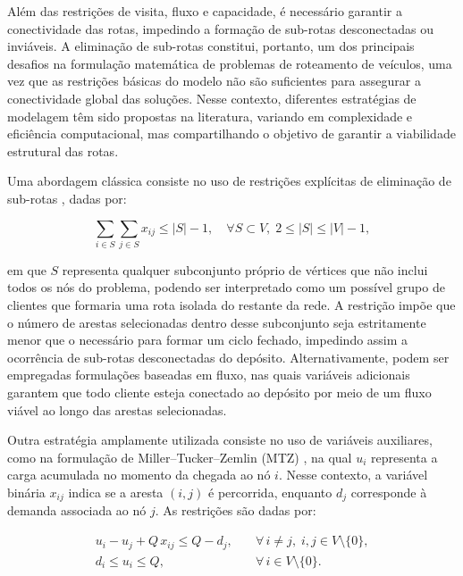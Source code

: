 Além das restrições de visita, fluxo e capacidade, é necessário garantir a conectividade das rotas, impedindo a formação de sub-rotas desconectadas ou inviáveis. A eliminação de sub-rotas constitui, portanto, um dos principais desafios na formulação matemática de problemas de roteamento de veículos, uma vez que as restrições básicas do modelo não são suficientes para assegurar a conectividade global das soluções. Nesse contexto, diferentes estratégias de modelagem têm sido propostas na literatura, variando em complexidade e eficiência computacional, mas compartilhando o objetivo de garantir a viabilidade estrutural das rotas.

Uma abordagem clássica consiste no uso de restrições explícitas de eliminação de sub-rotas \cite{dantzig2009solution}, dadas por:

\begin{equation}
\sum_{i \in S} \sum_{j \in S} x_{ij} \leq |S| - 1, 
\quad \forall S \subset V,\; 2 \leq |S| \leq |V|-1,
\end{equation}

\noindent em que $S$ representa qualquer subconjunto próprio de vértices que não inclui todos os nós do problema, podendo ser interpretado como um possível grupo de clientes que formaria uma rota isolada do restante da rede. A restrição impõe que o número de arestas selecionadas dentro desse subconjunto seja estritamente menor que o necessário para formar um ciclo fechado, impedindo assim a ocorrência de sub-rotas desconectadas do depósito. Alternativamente, podem ser empregadas formulações baseadas em fluxo, nas quais variáveis adicionais garantem que todo cliente esteja conectado ao depósito por meio de um fluxo viável ao longo das arestas selecionadas.

Outra estratégia amplamente utilizada consiste no uso de variáveis auxiliares, como na formulação de Miller--Tucker--Zemlin (MTZ) \cite{miller1960integer}, na qual $u_i$ representa a carga acumulada no momento da chegada ao nó $i$. Nesse contexto, a variável binária $x_{ij}$ indica se a aresta $(i,j)$ é percorrida, enquanto $d_j$ corresponde à demanda associada ao nó $j$. As restrições são dadas por:

\begin{eqnarray}
u_i - u_j + Q\, x_{ij} \leq Q - d_j, & \quad \forall\, i \neq j,\; i,j \in V \setminus \{0\}, \\[4pt]
d_i \leq u_i \leq Q, & \quad \forall\, i \in V \setminus \{0\}.
\end{eqnarray}

